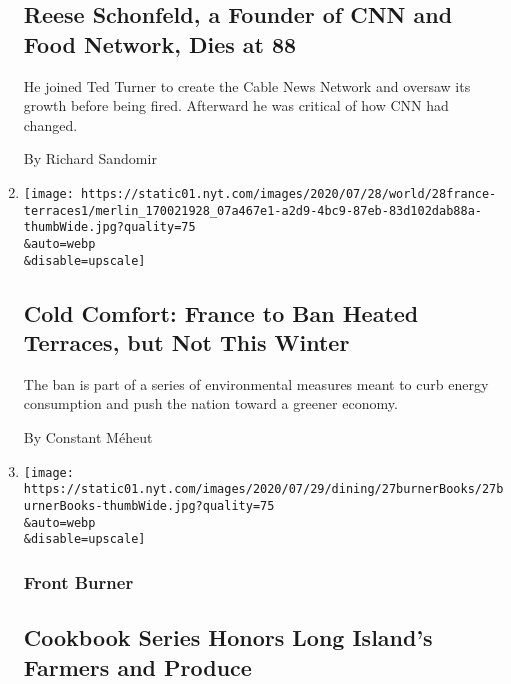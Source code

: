 \begin{enumerate}
  \hypertarget{reese-schonfeld-a-founder-of-cnn-and-food-network-dies-at-88}{%
  \subsection{Reese Schonfeld, a Founder of CNN and Food Network, Dies
  at
  88}\label{reese-schonfeld-a-founder-of-cnn-and-food-network-dies-at-88}}

  He joined Ted Turner to create the Cable News Network and oversaw its
  growth before being fired. Afterward he was critical of how CNN had
  changed.

  By Richard Sandomir
\item
  \href{/2020/07/28/world/europe/france-heated-terraces-coronavirus.html}{}

  \texttt{[image: https://static01.nyt.com/images/2020/07/28/world/28france-terraces1/merlin\_170021928\_07a467e1-a2d9-4bc9-87eb-83d102dab88a-thumbWide.jpg?quality=75\\\&auto=webp\\\&disable=upscale]}

  \hypertarget{cold-comfort-france-to-ban-heated-terraces-but-not-this-winter}{%
  \subsection{Cold Comfort: France to Ban Heated Terraces, but Not This
  Winter}\label{cold-comfort-france-to-ban-heated-terraces-but-not-this-winter}}

  The ban is part of a series of environmental measures meant to curb
  energy consumption and push the nation toward a greener economy.

  By Constant Méheut
\item
  \href{/2020/07/27/dining/fishes-and-loaves-farm-cookbooks.html}{}

  \texttt{[image: https://static01.nyt.com/images/2020/07/29/dining/27burnerBooks/27burnerBooks-thumbWide.jpg?quality=75\\\&auto=webp\\\&disable=upscale]}

  \hypertarget{front-burner-1}{%
  \subsubsection{Front Burner}\label{front-burner-1}}

  \hypertarget{cookbook-series-honors-long-islands-farmers-and-produce}{%
  \subsection{Cookbook Series Honors Long Island's Farmers and
  Produce}\label{cookbook-series-honors-long-islands-farmers-and-produce}}


\end{enumerate}
